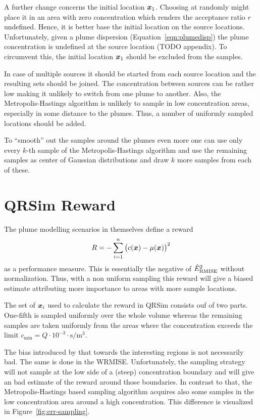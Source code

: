 A further change concerns the initial location $\bm{x}_1$. Choosing at randomly 
might place it in an area with zero concentration which renders the acceptance 
ratio $r$ undefined. Hence, it is better base the initial location on the source 
locations. Unfortunately, given a plume dispersion 
(Equation~\ref{eqn:plumedisp}) the plume concentration is undefined at the 
source location (TODO appendix). To circumvent this, the initial location $\bm{x}_1$ should be excluded from the samples.

In case of multiple sources it should be started from each source location and 
the resulting sets should be joined. The concentration between sources can be 
rather low making it unlikely to switch from one plume to another. Also, the 
Metropolis-Hastings algorithm is unlikely to sample in low concentration areas, 
especially in some distance to the plumes. Thus, a number of uniformly sampled 
locations should be added.

To ``smooth'' out the samples around the plumes even more one can use only every 
$k$-th sample of the Metropolis-Hastings algorithm and use the remaining samples 
as center of Gaussian distributions and draw $k$ more samples from each of 
these.

\section{QRSim Reward}\label{sec:qrsim-reward}
The plume modelling scenarios in \textcite{denardi2013rn} themselves define 
a reward
\begin{equation}
    R = - \sum_{i = 1}^n \del{c(\vc x) - \mu(\vc x)}^2
\end{equation}
as a performance measure. This is essentially the negative of 
$\hat{E}_{\mathrm{RMISE}}^2$ without normalization. Thus, with a non uniform sampling 
this reward will give a biased estimate attributing more importance to areas 
with more sample locations.

The set of $\bm{x}_i$ used to calculate the reward in QRSim consists ouf of two 
parts. One-fifth is sampled uniformly over the whole volume whereas the 
remaining samples are taken uniformly from the areas where the concentration 
exceeds the limit $c_{\min} = Q \cdot 10^{-3} \cdot 
\si{\second\per\meter\cubed}$.

The bias introduced by that towards the interesting regions is not necessarily 
bad. The same is done in the WRMISE\@. Unfortunately, the sampling strategy will 
not sample at the low side of a (steep) concentration boundary and will give an 
bad estimate of the reward around those boundaries. In contrast to that, the 
Metropolis-Hastings based sampling algorithm acquires also some samples in the 
low concentration area around a high concentration.  This difference is 
visualized in Figure~\ref{fig:err-sampling}.

